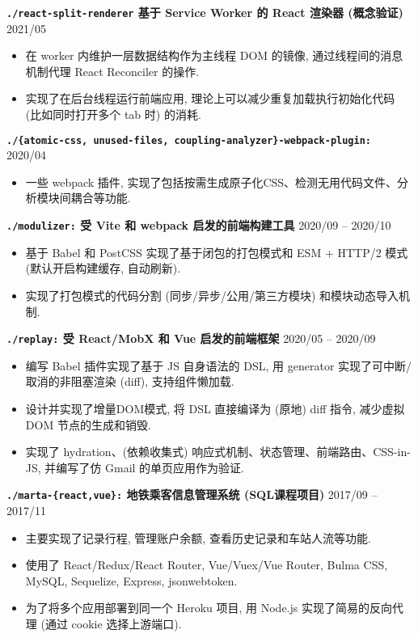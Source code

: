\documentclass[10 pt]{article}
\begin{document}
\textbf{\texttt{./react-split-renderer}  基于 Service Worker 的 React 渲染器 (概念验证)} \hfill 2021/05 
\begin{itemize}
\item  在 worker 内维护一层数据结构作为主线程 DOM 的镜像, 通过线程间的消息机制代理 React Reconciler 的操作.
\item 实现了在后台线程运行前端应用, 理论上可以减少重复加载执行初始化代码 (比如同时打开多个 tab 时) 的消耗.
\end{itemize}

\textbf{\texttt{./\{atomic-css, unused-files, coupling-analyzer\}-webpack-plugin:} } \hfill 2020/04
\begin{itemize}
\item 一些 webpack 插件, 实现了包括按需生成原子化CSS、检测无用代码文件、分析模块间耦合等功能.
\end{itemize}

\textbf{\texttt{./modulizer:} 受 Vite 和 webpack 启发的前端构建工具} \hfill 2020/09 -- 2020/10
\begin{itemize}
\item 基于 Babel 和 PostCSS 实现了基于闭包的打包模式和 ESM + HTTP/2 模式 (默认开启构建缓存, 自动刷新).
\item 实现了打包模式的代码分割 (同步/异步/公用/第三方模块) 和模块动态导入机制.
\end{itemize}

\textbf{\texttt{./replay:} 受 React/MobX 和 Vue 启发的前端框架} \hfill 2020/05 -- 2020/09
\begin{itemize}
\item 编写 Babel 插件实现了基于 JS 自身语法的 DSL, 用 generator 实现了可中断/取消的非阻塞渲染 (diff), 支持组件懒加载.
\item 设计并实现了增量DOM模式, 将 DSL 直接编译为 (原地) diff 指令, 减少虚拟 DOM 节点的生成和销毁.
\item 实现了 hydration、(依赖收集式) 响应式机制、状态管理、前端路由、CSS-in-JS, 并编写了仿 Gmail 的单页应用作为验证.
\end{itemize}


\textbf{\texttt{./marta-\{react,vue\}:} 地铁乘客信息管理系统 (SQL课程项目) } \hfill 2017/09 -- 2017/11
\begin{itemize}
\item 主要实现了记录行程, 管理账户余额, 查看历史记录和车站人流等功能.
\item 使用了 React/Redux/React Router, Vue/Vuex/Vue Router, Bulma  CSS, MySQL, Sequelize, Express, jsonwebtoken.
\item 为了将多个应用部署到同一个 Heroku 项目, 用 Node.js 实现了简易的反向代理 (通过 cookie 选择上游端口).
\end{itemize}
\end{document}
